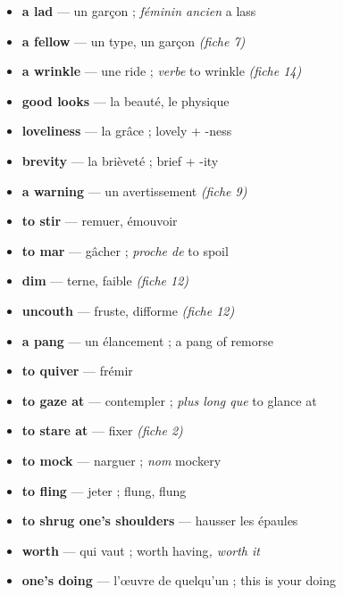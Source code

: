 \documentclass{fiche}
\begin{document}
\begin{itemize}[label=--,itemsep=0.8mm,leftmargin=*]\small
  \item \textbf{a lad} — un garçon ; \textit{féminin ancien} a lass
  \item \textbf{a fellow} — un type, un garçon \textit{(fiche 7)}
  \item \textbf{a wrinkle} — une ride ; \textit{verbe} to wrinkle \textit{(fiche 14)}
  \item \textbf{good looks} — la beauté, le physique
  \item \textbf{loveliness} — la grâce ; lovely + -ness
  \item \textbf{brevity} — la brièveté ; brief + -ity
  \item \textbf{a warning} — un avertissement \textit{(fiche 9)}
  \item \textbf{to stir} — remuer, émouvoir
  \item \textbf{to mar} — gâcher ; \textit{proche de} to spoil
  \item \textbf{dim} — terne, faible \textit{(fiche 12)}
  \item \textbf{uncouth} — fruste, difforme \textit{(fiche 12)}
  \item \textbf{a pang} — un élancement ; a pang of remorse
  \item \textbf{to quiver} — frémir
  \item \textbf{to gaze at} — contempler ; \textit{plus long que} to glance at
  \item \textbf{to stare at} — fixer \textit{(fiche 2)}
  \item \textbf{to mock} — narguer ; \textit{nom} mockery
  \item \textbf{to fling} — jeter ; flung, flung
  \item \textbf{to shrug one's shoulders} — hausser les épaules
  \item \textbf{worth} — qui vaut ; worth having\textit{, worth it}
  \item \textbf{one's doing} — l'œuvre de quelqu'un ; this is your doing
\end{itemize}
\end{document}
